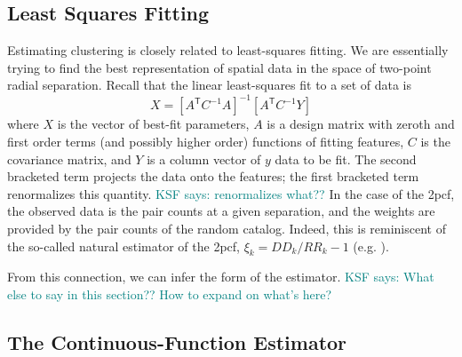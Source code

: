 \documentclass[modern]{aastex62}
\newcommand{\cf}{2pcf\xspace} %
\newcommand{\Est}{The Continuous-Function Estimator\xspace}
\newcommand{\inv}{^{-1}}
\newcommand{\T}{^{\mathsf{T}}}
\newcommand{\KSF}[1]{\textcolor{teal}{KSF says: #1}}
\begin{document}
\subsection{Least Squares Fitting}

Estimating clustering is closely related to least-squares fitting.
We are essentially trying to find the best representation of spatial data in the space of two-point radial separation.
Recall that the linear least-squares fit to a set of data is
\begin{equation}
X = [A\T C\inv A]\inv [A\T C\inv Y]
\end{equation}
where $X$ is the vector of best-fit parameters, $A$ is a design matrix with zeroth and first order terms (and possibly higher order) functions of fitting features, $C$ is the covariance matrix, and $Y$ is a column vector of $y$ data to be fit.
The second bracketed term projects the data onto the features; the first bracketed term renormalizes this quantity. \KSF{renormalizes what??}
In the case of the \cf, the observed data is the pair counts at a given separation, and the weights are provided by the pair counts of the random catalog.
Indeed, this is reminiscent of the so-called natural estimator of the \cf, $\xi_k = DD_k/RR_k - 1$ (e.g. \citealt{Kerscher2000}).

From this connection, we can infer the form of the estimator.
\KSF{What else to say in this section?? How to expand on what's here?}

\subsection{\Est}
\label{sec:est}
\end{document}
